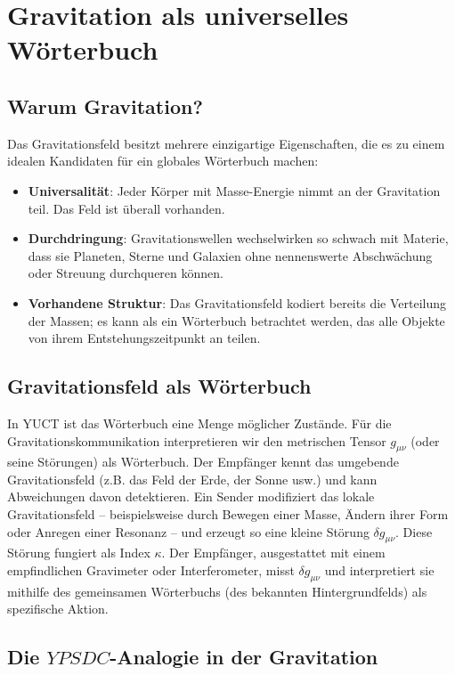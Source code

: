 \documentclass[12pt,a4paper]{article}
\newcommand{\YPSDC}{YPSDC}
\begin{document}
	\section{Gravitation als universelles Wörterbuch}
	\label{sec:gravity}
	
	\subsection{Warum Gravitation?}
	
	Das Gravitationsfeld besitzt mehrere einzigartige Eigenschaften, die es zu einem idealen Kandidaten für ein globales Wörterbuch machen:
	\begin{itemize}
		\item \textbf{Universalität}: Jeder Körper mit Masse-Energie nimmt an der Gravitation teil. Das Feld ist überall vorhanden.
		\item \textbf{Durchdringung}: Gravitationswellen wechselwirken so schwach mit Materie, dass sie Planeten, Sterne und Galaxien ohne nennenswerte Abschwächung oder Streuung durchqueren können.
		\item \textbf{Vorhandene Struktur}: Das Gravitationsfeld kodiert bereits die Verteilung der Massen; es kann als ein Wörterbuch betrachtet werden, das alle Objekte von ihrem Entstehungszeitpunkt an teilen.
	\end{itemize}
	
	\subsection{Gravitationsfeld als Wörterbuch}
	
	In YUCT ist das Wörterbuch eine Menge möglicher Zustände. Für die Gravitationskommunikation interpretieren wir den metrischen Tensor \(g_{\mu\nu}\) (oder seine Störungen) als Wörterbuch. Der Empfänger kennt das umgebende Gravitationsfeld (z.B. das Feld der Erde, der Sonne usw.) und kann Abweichungen davon detektieren. Ein Sender modifiziert das lokale Gravitationsfeld – beispielsweise durch Bewegen einer Masse, Ändern ihrer Form oder Anregen einer Resonanz – und erzeugt so eine kleine Störung \(\delta g_{\mu\nu}\). Diese Störung fungiert als Index \(\kappa\). Der Empfänger, ausgestattet mit einem empfindlichen Gravimeter oder Interferometer, misst \(\delta g_{\mu\nu}\) und interpretiert sie mithilfe des gemeinsamen Wörterbuchs (des bekannten Hintergrundfelds) als spezifische Aktion.
	
	\subsection{Die \(\YPSDC\)-Analogie in der Gravitation}
	
\end{document}
